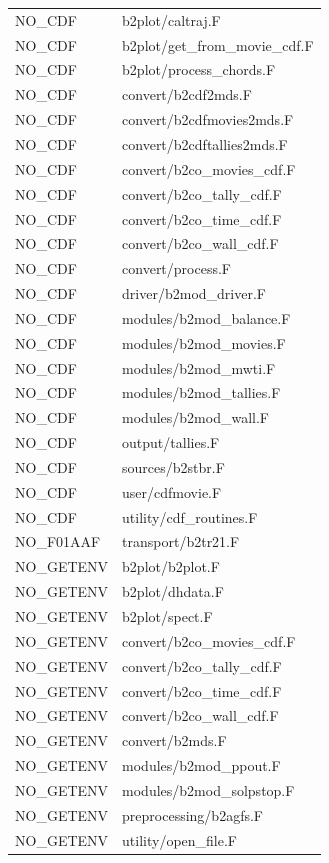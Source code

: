 \documentclass[a4paper,10pt]{report}
\begin{document}
\begin{center}
\begin{longtable}{|l|l|}
NO\_CDF & b2plot/caltraj.F \\
NO\_CDF & b2plot/get\_from\_movie\_cdf.F \\
NO\_CDF & b2plot/process\_chords.F \\
NO\_CDF & convert/b2cdf2mds.F \\
NO\_CDF & convert/b2cdfmovies2mds.F \\
NO\_CDF & convert/b2cdftallies2mds.F \\
NO\_CDF & convert/b2co\_movies\_cdf.F \\
NO\_CDF & convert/b2co\_tally\_cdf.F \\
NO\_CDF & convert/b2co\_time\_cdf.F \\
NO\_CDF & convert/b2co\_wall\_cdf.F \\
NO\_CDF & convert/process.F \\
NO\_CDF & driver/b2mod\_driver.F \\
NO\_CDF & modules/b2mod\_balance.F \\
NO\_CDF & modules/b2mod\_movies.F \\
NO\_CDF & modules/b2mod\_mwti.F \\
NO\_CDF & modules/b2mod\_tallies.F \\
NO\_CDF & modules/b2mod\_wall.F \\
NO\_CDF & output/tallies.F \\
NO\_CDF & sources/b2stbr.F \\
NO\_CDF & user/cdfmovie.F \\
NO\_CDF & utility/cdf\_routines.F \\
NO\_F01AAF & transport/b2tr21.F \\
NO\_GETENV & b2plot/b2plot.F \\
NO\_GETENV & b2plot/dhdata.F \\
NO\_GETENV & b2plot/spect.F \\
NO\_GETENV & convert/b2co\_movies\_cdf.F \\
NO\_GETENV & convert/b2co\_tally\_cdf.F \\
NO\_GETENV & convert/b2co\_time\_cdf.F \\
NO\_GETENV & convert/b2co\_wall\_cdf.F \\
NO\_GETENV & convert/b2mds.F \\
NO\_GETENV & modules/b2mod\_ppout.F \\
NO\_GETENV & modules/b2mod\_solpstop.F \\
NO\_GETENV & preprocessing/b2agfs.F \\
NO\_GETENV & utility/open\_file.F \\

\end{longtable}
\end{center}
\end{document}

